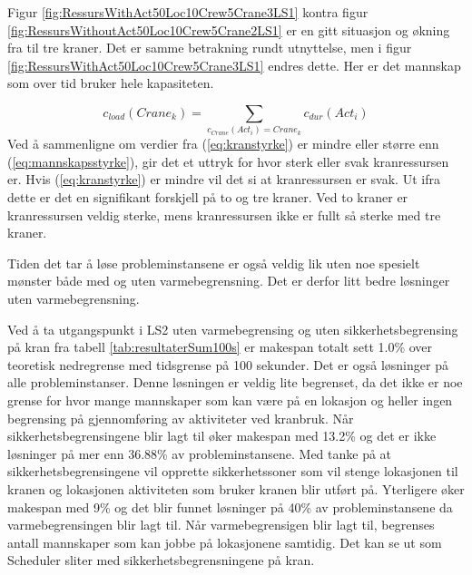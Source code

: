 Figur \ref{fig:RessursWithAct50Loc10Crew5Crane3LS1} kontra figur \ref{fig:RessursWithoutAct50Loc10Crew5Crane2LS1} er en gitt situasjon og økning fra til tre kraner. Det er samme betrakning rundt utnyttelse, men i figur \ref{fig:RessursWithAct50Loc10Crew5Crane3LS1} endres dette. Her er det mannskap som over tid bruker hele kapasiteten.

\begin{equation}
c_{load}(Crane_{k}) = \sum_{c_{Crane}(Act_{i})=Crane_{k}} c_{dur}(Act_{i})
\label{eq:kranstyrke}
\end{equation}
Ved å sammenligne om verdier fra (\ref{eq:kranstyrke}) er mindre eller større enn (\ref{eq:mannskapsstyrke}), gir det et uttryk for hvor sterk eller svak kranressursen er. Hvis (\ref{eq:kranstyrke}) er mindre vil det si at kranressursen er svak. Ut ifra dette er det en signifikant forskjell på to og tre kraner. Ved to kraner er kranressursen veldig sterke, mens kranressursen ikke er fullt så sterke med tre kraner.

Tiden det tar å løse probleminstansene er også veldig lik uten noe spesielt mønster både med og uten varmebegrensning. Det er derfor litt bedre løsninger uten varmebegrensning.

Ved å ta utgangspunkt i LS2 uten varmebegrensing og uten sikkerhetsbegrensing på kran fra tabell \ref{tab:resultaterSum100s} er makespan totalt sett 1.0\% over teoretisk nedregrense med tidsgrense på 100 sekunder. Det er også løsninger på alle probleminstanser. Denne løsningen er veldig lite begrenset, da det ikke er noe grense for hvor mange mannskaper som kan være på en lokasjon og heller ingen begrensing på gjennomføring av aktiviteter ved kranbruk. Når sikkerhetsbegrensingene blir lagt til øker makespan med 13.2\% og det er ikke løsninger på mer enn 36.88\% av probleminstansene. Med tanke på at sikkerhetsbegrensingene vil opprette sikkerhetssoner som vil stenge lokasjonen til kranen og lokasjonen aktiviteten som bruker kranen blir utført på. Yterligere øker makespan med 9\% og det blir funnet løsninger på 40\% av probleminstansene da varmebegrensingen blir lagt til. Når varmebegrensigen blir lagt til, begrenses antall mannskaper som kan jobbe på lokasjonene samtidig. Det kan se ut som Scheduler sliter med sikkerhetsbegrensningene på kran.

